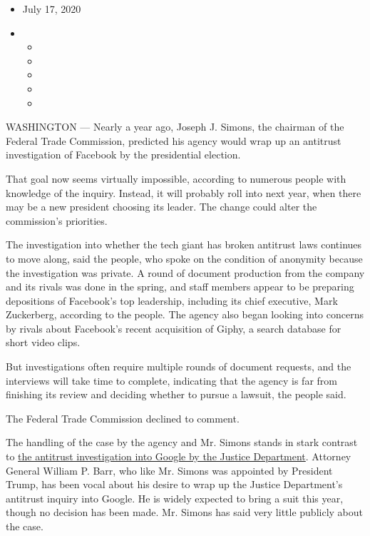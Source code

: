 \begin{itemize}
\item
  July 17, 2020
\item
  \begin{itemize}
  \item
  \item
  \item
  \item
  \item
  \end{itemize}
\end{itemize}

WASHINGTON --- Nearly a year ago, Joseph J. Simons, the chairman of the
Federal Trade Commission, predicted his agency would wrap up an
antitrust investigation of Facebook by the presidential election.

That goal now seems virtually impossible, according to numerous people
with knowledge of the inquiry. Instead, it will probably roll into next
year, when there may be a new president choosing its leader. The change
could alter the commission's priorities.

The investigation into whether the tech giant has broken antitrust laws
continues to move along, said the people, who spoke on the condition of
anonymity because the investigation was private. A round of document
production from the company and its rivals was done in the spring, and
staff members appear to be preparing depositions of Facebook's top
leadership, including its chief executive, Mark Zuckerberg, according to
the people. The agency also began looking into concerns by rivals about
Facebook's recent acquisition of Giphy, a search database for short
video clips.

But investigations often require multiple rounds of document requests,
and the interviews will take time to complete, indicating that the
agency is far from finishing its review and deciding whether to pursue a
lawsuit, the people said.

The Federal Trade Commission declined to comment.

The handling of the case by the agency and Mr. Simons stands in stark
contrast to
\href{https://www.nytimes3xbfgragh.onion/2020/06/25/technology/barr-google-investigation.html}{the
antitrust investigation into Google by the Justice Department}. Attorney
General William P. Barr, who like Mr. Simons was appointed by President
Trump, has been vocal about his desire to wrap up the Justice
Department's antitrust inquiry into Google. He is widely expected to
bring a suit this year, though no decision has been made. Mr. Simons has
said very little publicly about the case.

